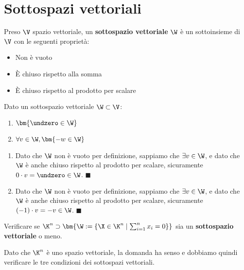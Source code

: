 \documentclass[11pt, a4paper, titlepage, oneside]{scrbook}
\begin{document}
\section{Sottospazi vettoriali}

\begin{Definizione}
\label{def-sott-vett}
Preso $\V$ spazio vettoriale, un \textbf{sottospazio vettoriale} $\W$ è un sottoinsieme di $\V$ con le seguenti proprietà:
\begin{itemize}
    \item Non è vuoto
    \item È chiuso rispetto alla somma
    \item È chiuso rispetto al prodotto per scalare
\end{itemize}
\end{Definizione}

\begin{Osservazione}[]
\label{oss-sott-vet}
Dato un sottospazio vettoriale $\W \subset \V$:
\begin{enumerate}[label=\alph*)]
    \item $\bm{\undzero \in \W}$
    \item $\forall v \in \W, \bm{-w \in \W}$
\end{enumerate}
\end{Osservazione}

\Dimostrazione \nopagebreak

\begin{enumerate}[label=\alph*)]
    \item Dato che $\W$ non è vuoto per definizione, sappiamo che $\exists v \in \W$, e dato che $\W$ è anche chiuso rispetto al prodotto per scalare, sicuramente $0 \cdot v = \undzero \in \W$. $\blacksquare$
    \item Dato che $\W$ non è vuoto per definizione, sappiamo che $\exists v \in \W$, e dato che $\W$ è anche chiuso rispetto al prodotto per scalare, sicuramente $(-1) \cdot v = -v \in \W$. $\blacksquare$
\end{enumerate}

\Esempio \nopagebreak

Verificare se $\K^n \supset \bm{\W := \{\X \in \K^n \mid \sum_{i = 1}^n x_i = 0\}}$ sia un \textbf{sottospazio vettoriale} o meno. \nopagebreak

Dato che $\K^n$ è uno spazio vettoriale, la domanda ha senso e dobbiamo quindi verificare le tre condizioni dei sottospazi vettoriali.
\end{document}
